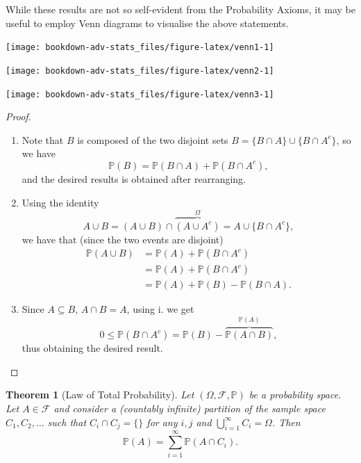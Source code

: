\documentclass[
]{book}
\newcommand{\bbP}{\mathbb{P}}
\newcommand{\cF}{{\mathcal F}}
\newtheorem{theorem}{Theorem}[chapter]
\theoremstyle{definition}
\theoremstyle{definition}
\theoremstyle{definition}
\theoremstyle{definition}
\theoremstyle{remark}
\begin{document}
While these results are not so self-evident from the Probability Axioms, it may be useful to employ Venn diagrams to visualise the above statements.

\begin{center}\texttt{[image: bookdown-adv-stats\_files/figure-latex/venn1-1]} \end{center}

\begin{center}\texttt{[image: bookdown-adv-stats\_files/figure-latex/venn2-1]} \end{center}

\begin{center}\texttt{[image: bookdown-adv-stats\_files/figure-latex/venn3-1]} \end{center}

\begin{proof}

\begin{enumerate}
\def\labelenumi{\roman{enumi}.}
\item
  Note that \(B\) is composed of the two disjoint sets \(B= \{B\cap A\} \cup \{ B \cap A^c\}\), so we have \[\bbP(B) = \bbP(B\cap A) + \bbP(B \cap A^c),\] and the desired results is obtained after rearranging.
\item
  Using the identity \[A \cup B = (A \cup B) \cap \overbrace{(A \cup A^c)}^\Omega=A \cup \{B \cap A^c \},\] we have that (since the two events are disjoint)
  \begin{align*}
  \bbP(A \cup B) &= \bbP(A) + \bbP(B \cap A^c) \\
  &= \bbP(A) + \bbP(B \cap A^c) \\
  &= \bbP(A) + \bbP(B) - \bbP(B\cap A).
  \end{align*}
\item
  Since \(A \subseteq B\), \(A \cap B = A\), using i. we get \[0 \leq \bbP(B \cap A^c) = \bbP(B) - \overbrace{\bbP(A\cap B)}^{\bbP(A)},\] thus obtaining the desired result.
\end{enumerate}

\end{proof}

\begin{theorem}[Law of Total Probability]
\protect\hypertarget{thm:lawoftotalprob}{}\label{thm:lawoftotalprob}Let \((\Omega,\cF,\bbP)\) be a probability space. Let \(A\in\cF\) and consider a (countably infinite) partition of the sample space \(C_1,C_2,\dots\) such that \(C_i\cap C_j = \{\}\) for any \(i,j\) and \(\bigcup_{i=1}^\infty C_i = \Omega\). Then
\[
\bbP(A) = \sum_{i=1}^\infty \bbP(A \cap C_i).
\]
\end{theorem}
\end{document}
